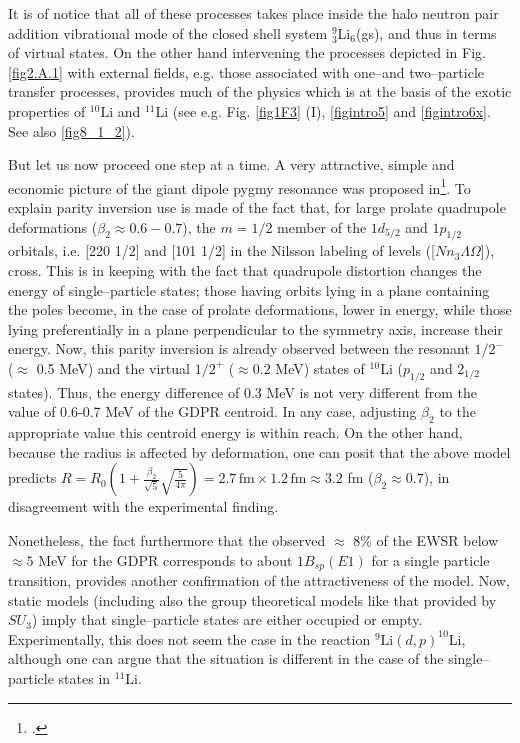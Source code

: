 \begin{subappendices}
 
It is of notice that all of these processes takes place inside the halo neutron pair addition vibrational mode of the closed shell system $^9_3$Li$_6$(gs), and thus in terms of virtual states. On the other hand intervening the processes depicted in Fig. \ref{fig2.A.1} with external fields, e.g. those associated with one--and two--particle transfer processes, provides much of the physics which is at the basis of the exotic properties of $^{10}$Li and $^{11}$Li (see e.g. Fig. \ref{fig1F3} (I), \ref{figintro5} and \ref{figintro6x}. See also \ref{fig8_1_2}). 


But let us now proceed one step at a time. A very attractive, simple and economic picture of the giant dipole pygmy resonance was proposed in\footnote{\cite{Hamamoto:07}.}. To explain parity inversion use is made of the fact that, for large prolate quadrupole deformations ($\beta_2\approx0.6-0.7$), the $m=1/2$ member of the $1d_{5/2}$ and $1p_{1/2}$ orbitals, i.e. [220 1/2] and [101 1/2] in the Nilsson labeling of levels ([$Nn_3\Lambda\Omega$]), cross. This is in keeping with the fact that quadrupole distortion changes the energy of single--particle states; those having orbits lying in a plane containing the poles become, in the case of prolate deformations, lower in energy, while those lying preferentially in a plane perpendicular to the symmetry axis, increase their energy. Now, this parity inversion is already observed between the resonant $1/2^-$ ($\approx$ 0.5 MeV) and the virtual $1/2^+$ ($\approx 0.2$ MeV) states of $^{10}$Li ($p_{1/2}$ and $2_{1/2}$ states). Thus, the energy difference of 0.3 MeV is not very different from the value of 0.6-0.7 MeV of the GDPR centroid. In any case, adjusting $\beta_2$ to the appropriate value this centroid energy is within reach. On the other hand, because the radius is  affected by deformation, one can posit that the above model predicts  $R=R_0(1+\frac{\beta_2}{\sqrt{5}}\sqrt{\frac{5}{4\pi}})=2.7\,\text{fm}\times 1.2\,\text{fm}\approx 3.2$ fm ($\beta_2\approx0.7$), in disagreement  with the experimental finding. 


Nonetheless, the fact furthermore that the observed $\approx$ 8\% of the EWSR below $\approx 5$ MeV for the GDPR corresponds to about $1B_{sp}(E1)$ for a single particle transition, provides another confirmation of the attractiveness of the model. Now, static models (including also the group theoretical models like that provided by $SU_3$) imply that single--particle states are either occupied or empty. Experimentally, this does not seem the case in the reaction $^9$Li$(d,p)^{10}$Li, although one can argue that the situation is different in the case of the single--particle states in $^{11}$Li.



\end{subappendices}
